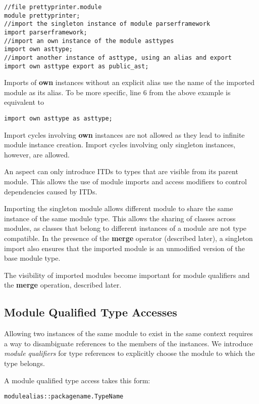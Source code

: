 \begin{lstlisting}[caption={Imports}, label={figure:imports}]
//file prettyprinter.module
module prettyprinter;
//import the singleton instance of module parserframework
import parserframework; 
//import an own instance of the module asttypes
import own asttype;
//import another instance of asttype, using an alias and export
import own asttype export as public_ast;
\end{lstlisting}

Imports of \textbf{own} instances without an explicit alias use the name
of the imported module as its alias. To be more specific, line 6 from the above
example is equivalent to
\begin{lstlisting}
import own asttype as asttype;
\end{lstlisting}

Import cycles involving \textbf{own} instances are not allowed as they
lead to infinite module instance creation. Import cycles involving only
singleton instances, however, are allowed.

An aspect can only introduce ITDs to types that are visible from its parent module. 
This allows the use of module imports and access modifiers to control dependencies
caused by ITDs.

Importing the singleton module allows different module to share the same instance
of the same module type. This allows the sharing of classes across modules, as
classes that belong to different instances of a module are not type compatible.
In the presence of the \textbf{merge} operator (described later), a singleton import
also ensures that the imported module is an unmodified version of the base module type.

The visibility of imported modules become important for module qualifiers and the \textbf{merge} operation, described later.

\subsection{Module Qualified Type Accesses}

Allowing two instances of the same module to exist in the same context
requires a way to disambiguate references to the members of the instances.
We introduce \textit{module qualifiers} for type references to explicitly
choose the module to which the type belongs.

A module qualified type access takes this form:

\begin{lstlisting}
modulealias::packagename.TypeName
\end{lstlisting}


